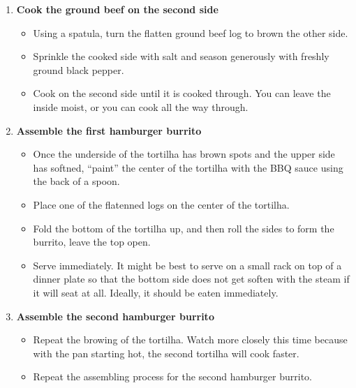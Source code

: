 \documentclass[11pt,letterpaper]{article}
\newcommand \fileName {HamburgerBurrito}
\begin{document}
\begin {description}
\begin{enumerate}
\item {\bf Cook the ground beef on the second side}
\begin{itemize}
\item Using a spatula, turn the flatten ground beef log to brown the other side.
\item Sprinkle the cooked side with salt and season generously with freshly ground black pepper.
\item Cook on the second side until it is cooked through. You can leave the inside moist, or you can cook all the way through.
\end{itemize}

\item {\bf Assemble the first hamburger burrito}
\begin{itemize}
\item Once the underside of the tortilha has brown spots and the upper side has softned, ``paint'' the center of the tortilha with the BBQ sauce using the back of a spoon.
\item Place one of the flatenned logs on the center of the tortilha. 
\item Fold the bottom of the tortilha up, and then roll the sides to form the burrito, leave the top open. 
\item Serve immediately. It might be best to serve on a small rack on top of a dinner plate so that the bottom side does not get soften with the steam if it will seat at all. Ideally, it should be eaten immediately.
\end{itemize}

\item {\bf Assemble the second hamburger burrito}
\begin{itemize}
\item Repeat the browing of the tortilha. Watch more closely this time because with the pan starting hot, the second tortilha will cook faster.
\item Repeat the assembling process for the second hamburger burrito.
\end{itemize}

\end{enumerate}
\end{description}


\end{document}
